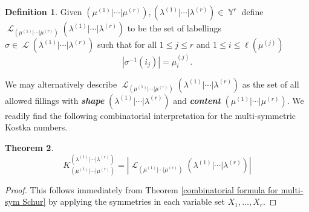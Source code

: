 \documentclass[12pt,reqno]{amsart}
\theoremstyle{definition}
\newtheorem{thm}{Theorem}[section]
\newtheorem{defn}[thm]{Definition}
\DeclareMathOperator{\Par}{\mathbb{Y}}
\DeclareMathOperator{\cL}{\mathcal{L}}
\begin{document}
\begin{defn}
    Given $(\mu^{(1)}|\cdots|\mu^{(r)}),(\lambda^{(1)}|\cdots|\lambda^{(r)}) \in \Par^r$ define $\cL_{(\mu^{(1)}|\cdots|\mu^{(r)})}(\lambda^{(1)}|\cdots|\lambda^{(r)})$ to be the set of labellings $\sigma \in \cL(\lambda^{(1)}|\cdots|\lambda^{(r)})$ such that for all $1\leq j \leq r$ and $1 \leq i \leq \ell(\mu^{(j)})$ 
    $$|\sigma^{-1}(i_j)| = \mu^{(j)}_i.$$
\end{defn}

We may alternatively describe $\cL_{(\mu^{(1)}|\cdots|\mu^{(r)})}(\lambda^{(1)}|\cdots|\lambda^{(r)})$ as the set of all allowed fillings with \textbf{\textit{shape}} $(\lambda^{(1)}|\cdots|\lambda^{(r)})$ and \textbf{\textit{content}} $(\mu^{(1)}|\cdots|\mu^{(r)}).$ We readily find the following combinatorial interpretation for the multi-symmetric Kostka numbers.

\begin{thm}\label{Kostka coeff thm}
    $$K_{(\mu^{(1)}|\cdots|\mu^{(r)})}^{(\lambda^{(1)}|\cdots|\lambda^{(r)})} = |\cL_{(\mu^{(1)}|\cdots|\mu^{(r)})}(\lambda^{(1)}|\cdots|\lambda^{(r)})|$$
\end{thm}
\begin{proof}
    This follows immediately from Theorem \ref{combinatorial formula for multi-sym Schur} by applying the symmetries in each variable set $X_1,\ldots, X_r.$ 
\end{proof}
\end{document}
